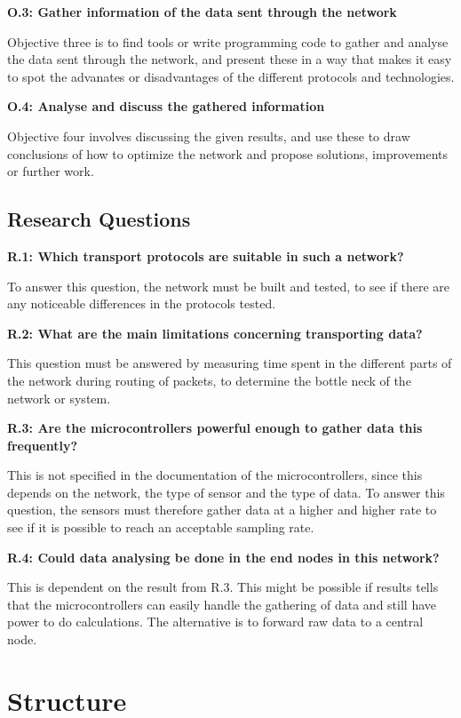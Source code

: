 \noindent\textbf{O.3: Gather information of the data sent through the network}

\noindent Objective three is to find tools or write programming code to gather and analyse the data sent through the network, and present these in a way that makes it easy to spot the advanates or disadvantages of the different protocols and technologies. 

\noindent\textbf{O.4: Analyse and discuss the gathered information}

\noindent Objective four involves discussing the given results, and use these to draw conclusions of how to optimize the network and propose solutions, improvements or further work. 

\subsection{Research Questions}

\noindent \textbf{R.1: Which transport protocols are suitable in such a network?}

\noindent To answer this question, the network must be built and tested, to see if there are any noticeable differences in the protocols tested.

\noindent\textbf{R.2: What are the main limitations concerning transporting data?}

\noindent This question must be answered by measuring time spent in the different parts of the network during routing of packets, to determine the bottle neck of the network or system. 

\noindent\textbf{R.3: Are the microcontrollers powerful enough to gather data this frequently?}

\noindent This is not specified in the documentation of the microcontrollers, since this depends on the network, the type of sensor and the type of data. To answer this question, the sensors must therefore gather data at a higher and higher rate to see if it is possible to reach an acceptable sampling rate. 

\noindent\textbf{R.4: Could data analysing be done in the end nodes in this network?}

\noindent This is dependent on the result from R.3. This might be possible if results tells that the microcontrollers can easily handle the gathering of data and still have power to do calculations. The alternative is to forward raw data to a central node. 

\section{Structure}


